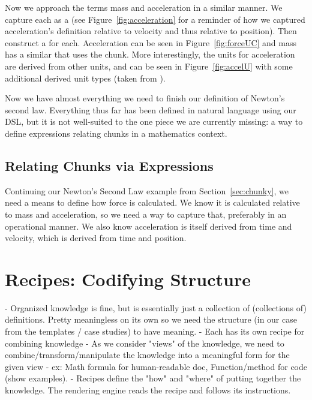 
Now we approach the terms mass and acceleration in a similar manner. We capture 
each as a  (see Figure~\ref{fig:acceleration} for a 
reminder of how we captured acceleration's definition relative to velocity and 
thus relative to position). Then construct a  for each. 
Acceleration can be seen in Figure~\ref{fig:forceUC} and mass has a similar 
 that uses the  chunk. More 
interestingly, the units for acceleration are derived from other units, and can 
be seen in Figure~\ref{fig:accelU} with some additional derived unit types 
(taken from ).

Now we have almost everything we need to finish our definition of Newton's 
second law. Everything thus far has been defined in natural language using our 
 DSL, but it is not well-suited to the one piece we are 
currently missing: a way to define expressions relating chunks in a 
mathematics context.

\subsection{Relating Chunks via Expressions}
\label{sec:expr}

Continuing our Newton's Second Law example from Section~\ref{sec:chunky}, we 
need a means to define how force is calculated. We know it is calculated 
relative to mass and acceleration, so we need a way to capture that, preferably 
in an operational manner. We also know acceleration is itself derived from 
time and velocity, which is derived from time and position.


\section{Recipes: Codifying Structure}
\label{sec:recipes}
  - Organized knowledge is fine, but is essentially just a collection of (collections of) definitions. Pretty meaningless on its own so we need the structure (in our case from the templates / case studies) to have meaning.
  - Each \sf{} has its own recipe for combining knowledge
  - As we consider \sfs{} "views" of the knowledge, we need to 
  combine/transform/manipulate the knowledge into a meaningful form for the 
  given view - ex: Math formula for human-readable doc, Function/method for 
  code (show examples).
  - Recipes define the "how" and "where" of putting together the knowledge. The rendering engine reads the recipe and follows its instructions.

